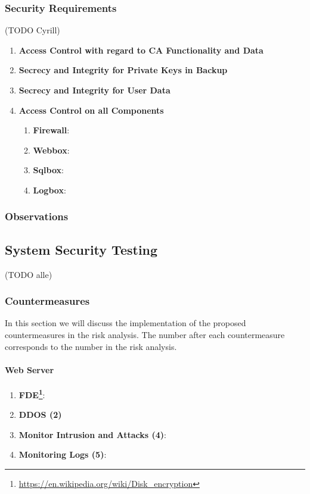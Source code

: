 \documentclass[english]{article}
\begin{document}
\subsubsection{Security Requirements} (TODO Cyrill)
\begin{enumerate}

\item \textbf{Access Control with regard to CA Functionality and Data}
\item \textbf{Secrecy and Integrity for Private Keys in Backup}
\item \textbf{Secrecy and Integrity for User Data}
\item \textbf{Access Control on all Components}
\begin{enumerate}[label=(\alph*)]
\item \textbf{Firewall}:
\item \textbf{Webbox}:
\item \textbf{Sqlbox}:
\item \textbf{Logbox}:
\end{enumerate}
\end{enumerate}
\subsubsection*{Observations}

\subsection{System Security Testing} (TODO alle)


\subsubsection{Countermeasures}
In this section we will discuss the implementation of the proposed countermeasures in the risk analysis. The number after each countermeasure corresponds to the number in the risk analysis.

\paragraph{Web Server}
\begin{enumerate}[label=(\alph*)] \item \textbf{FDE\footnote{\url{https://en.wikipedia.org/wiki/Disk_encryption}}}:
\item \textbf{DDOS (2)}
\item \textbf{Monitor Intrusion and Attacks (4)}:
\item \textbf{Monitoring Logs (5)}:
\end{enumerate} 
\end{document}
